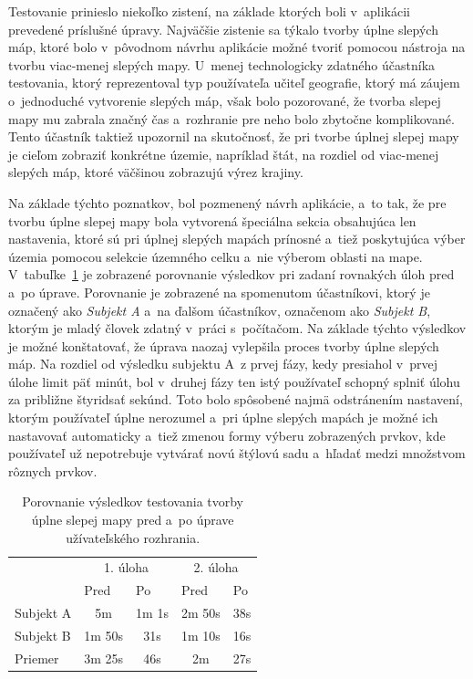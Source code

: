 Testovanie prinieslo niekoľko zistení, na základe ktorých boli v~aplikácii prevedené príslušné úpravy. Najväčšie zistenie sa týkalo tvorby úplne slepých máp, ktoré bolo v~pôvodnom návrhu aplikácie možné tvoriť pomocou nástroja na tvorbu viac-menej slepých mapy. U~menej technologicky zdatného účastníka testovania, ktorý reprezentoval typ používateľa učiteľ geografie, ktorý má záujem o~jednoduché vytvorenie slepých máp, však bolo pozorované, že tvorba slepej mapy mu zabrala značný čas a~rozhranie pre neho bolo zbytočne komplikované. Tento účastník taktiež upozornil na skutočnosť, že pri tvorbe úplnej slepej mapy je cieľom zobraziť konkrétne územie, napríklad štát, na rozdiel od viac-menej slepých máp, ktoré väčšinou zobrazujú výrez krajiny.

Na základe týchto poznatkov, bol pozmenený návrh aplikácie, a~to tak, že pre tvorbu úplne slepej mapy bola vytvorená špeciálna sekcia obsahujúca len nastavenia, ktoré sú pri úplnej slepých mapách prínosné a~tiež poskytujúca výber územia pomocou selekcie územného celku a~nie výberom oblasti na mape. V~tabuľke~\ref{blind_time} je zobrazené porovnanie výsledkov pri zadaní rovnakých úloh pred a~po úprave. Porovnanie je zobrazené na spomenutom účastníkovi, ktorý je označený ako {\it Subjekt A} a~na ďalšom účastníkov, označenom ako {\it Subjekt B}, ktorým je mladý človek zdatný v~práci s~počítačom. Na základe týchto výsledkov je možné konštatovať, že úprava naozaj vylepšila proces tvorby úplne slepých máp. Na rozdiel od výsledku subjektu A~z prvej fázy, kedy presiahol v~prvej úlohe limit päť minút, bol v~druhej fázy ten istý používateľ schopný splniť úlohu za približne štyridsať sekúnd. Toto bolo spôsobené najmä odstránením nastavení, ktorým používateľ úplne nerozumel a~pri úplne slepých mapách je možné ich nastavovať automaticky a~tiež zmenou formy výberu zobrazených prvkov, kde používateľ už nepotrebuje vytvárať novú štýlovú sadu a~hľadať medzi množstvom rôznych prvkov.

\begin{table}[H]
    \vskip6pt
	\caption{Porovnanie výsledkov testovania tvorby úplne slepej mapy pred a~po úprave užívateľského rozhrania.}
    \vskip6pt
	\centering
    \begin{tabular}{lcccc}
        \multicolumn{1}{c}{} & \multicolumn{2}{c}{1. úloha} & \multicolumn{2}{c}{2. úloha} \\
		\cmidrule(r){2-5}
        \multicolumn{1}{l}{} & \multicolumn{1}{l}{Pred} & \multicolumn{1}{l}{Po} & \multicolumn{1}{l}{Pred} & \multicolumn{1}{l}{Po} \\ 
        \midrule
        Subjekt A & 5m & 1m 1s & 2m 50s & 38s \\
        Subjekt B & 1m 50s & 31s & 1m 10s & 16s \\ 
        \midrule
        Priemer & 3m 25s & 46s & 2m & 27s
    \end{tabular}
	\label{blind_time}
\end{table}


